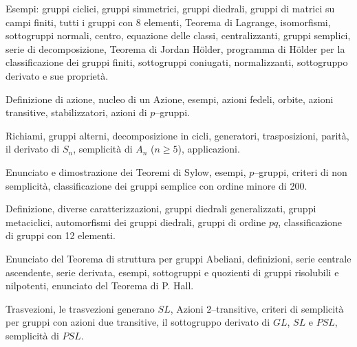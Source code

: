 
\def\abbrcorso{AL5}
\def\titolocorso{Istituzioni di Algebra Superiore (2$^0$ Modulo)}
\def\sottotitolo{Teoria dei gruppi finiti}
\def\docente{Prof. Francesco Pappalardi}
\def\crediti{7}
\def\semestre{II}
\def\esoneri{1}
\def\scrittofinale{1}
\def\oralefinale{0}
\def\altreprove{1}
\Intestazione


 Esempi: gruppi ciclici, gruppi simmetrici, gruppi diedrali,
gruppi di matrici su campi finiti, tutti i gruppi con $8$ elementi, Teorema di Lagrange,
isomorfismi, sottogruppi normali, centro, equazione delle classi,
centralizzanti, gruppi semplici, serie di decomposizione, Teorema
di Jordan H\"older, programma di H\"older per la classificazione
dei gruppi finiti, sottogruppi coniugati, normalizzanti, sottogruppo
derivato e sue propriet\`a.


Definizione di azione, nucleo di un Azione, esempi, azioni fedeli, orbite,
azioni transitive, stabilizzatori, azioni di $p$--gruppi.


Richiami, gruppi alterni, decomposizione in cicli, generatori,
trasposizioni, parit\`a, il derivato di $S_n$,
semplicit\`a di $A_n$ ($n\geq 5$), applicazioni.


Enunciato e dimostrazione dei Teoremi di Sylow, esempi,
$p$--gruppi, criteri di non semplicit\`a,
classificazione dei gruppi semplice con ordine minore di 200.


Definizione, diverse caratterizzazioni, gruppi diedrali generalizzati,
gruppi metaciclici, automorfismi dei gruppi diedrali, gruppi di ordine $pq$,
classificazione di gruppi con 12 elementi.


Enunciato del
Teorema di struttura per gruppi Abeliani, definizioni, serie centrale
ascendente, serie derivata, esempi, sottogruppi e quozienti
di gruppi risolubili e nilpotenti, enunciato del Teorema di P. Hall.


Trasvezioni, le trasvezioni generano $SL$, Azioni $2$--transitive,
criteri di semplicit\`a per gruppi con azioni due transitive,
il sottogruppo derivato di $GL$, $SL$ e $PSL$, semplicit\`a
di $PSL$.

